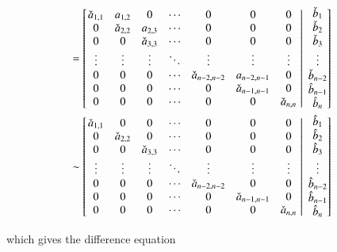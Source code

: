 \documentclass[11pt,english,a4paper]{article}
\begin{document}
\begin{flushleft}
\begin{align*}
\\ &= \left[{\left.\begin{matrix} \check a_{1,1} & a_{1,2} & 0 & \cdots & 0 & 0 & 0 \\ 0 &  \check a_{2,2} & a_{2,3} & \cdots & 0 & 0 & 0\\ 0 & 0 & \check a_{3,3} & \cdots & 0 & 0 & 0\\ \vdots & \vdots & \vdots  & \ddots & \vdots & \vdots & \vdots \\ 0 & 0 & 0 & \cdots & \check a_{n-2,n-2} & a_{n-2,n-1} & 0 \\ 0 & 0 & 0 & \cdots & 0 & \check a_{n-1,n-1} & 0 \\ 0 & 0 & 0 &\cdots & 0 & 0 & \check a_{n,n} \end{matrix}\,\,\right\vert\,\,\begin{matrix} \check b_1 \\ \check b_2\\ \check b_3 \\ \vdots \\ \check b_{n-2} \\ \hat b_{n-1} \\ \hat b_n\end{matrix}}\right] 
\\ &\sim \left[{\left.\begin{matrix} \check a_{1,1} & 0 & 0 & \cdots & 0 & 0 & 0 \\ 0 &  \check a_{2,2} & 0 & \cdots & 0 & 0 & 0\\ 0 & 0 & \check a_{3,3} & \cdots & 0 & 0 & 0\\ \vdots & \vdots & \vdots  & \ddots & \vdots & \vdots & \vdots \\ 0 & 0 & 0 & \cdots & \check a_{n-2,n-2} & 0 & 0 \\ 0 & 0 & 0 & \cdots & 0 & \check a_{n-1,n-1} & 0 \\ 0 & 0 & 0 &\cdots & 0 & 0 & \check a_{n,n} \end{matrix}\,\,\right\vert\,\,\begin{matrix} \hat b_1 \\ \hat b_2\\ \hat b_3 \\ \vdots \\ \hat b_{n-2} \\ \hat b_{n-1} \\ \hat b_n\end{matrix}}\right] 
\end{align*}

which gives the difference equation


\end{flushleft}
\end{document}
